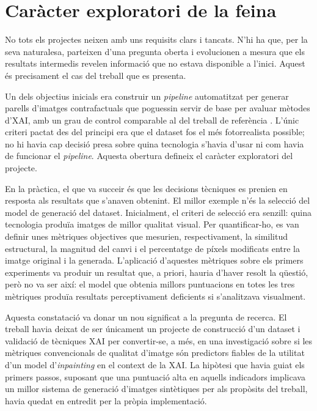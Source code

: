 \section{Caràcter exploratori de la feina}
No tots els projectes neixen amb uns requisits clars i tancats. N'hi ha que, per la seva naturalesa, parteixen d'una pregunta oberta i evolucionen a mesura que els resultats intermedis revelen informació que no estava disponible a l'inici. Aquest és precisament el cas del treball que es presenta.

Un dels objectius inicials era construir un \emph{pipeline} automatitzat per generar parells d'imatges contrafactuals que poguessin servir de base per avaluar mètodes d'XAI, amb un grau de control comparable al del treball de referència \cite{Hesse2023}. L'únic criteri pactat des del principi era que el dataset fos el més fotorrealista possible; no hi havia cap decisió presa sobre quina tecnologia s'havia d'usar ni com havia de funcionar el \emph{pipeline}. Aquesta obertura defineix el caràcter exploratori del projecte.

En la pràctica, el que va succeir és que les decisions tècniques es prenien en resposta als resultats que s'anaven obtenint. El millor exemple n'és la selecció del model de generació del dataset. Inicialment, el criteri de selecció era senzill: quina tecnologia produïa imatges de millor qualitat visual. Per quantificar-ho, es van definir unes mètriques objectives que mesurien, respectivament, la similitud estructural, la magnitud del canvi i el percentatge de píxels modificats entre la imatge original i la generada. L'aplicació d'aquestes mètriques sobre els primers experiments va produir un resultat que, a priori, hauria d'haver resolt la qüestió, però no va ser així: el model que obtenia millors puntuacions en totes les tres mètriques produïa resultats perceptivament deficients si s'analitzava visualment.

Aquesta constatació va donar un nou significat a la pregunta de recerca. El treball havia deixat de ser únicament un projecte de construcció d'un dataset i validació de tècniques \ac{XAI} per convertir-se, a més, en una investigació sobre si les mètriques convencionals de qualitat d'imatge són predictors fiables de la utilitat d'un model d'\emph{inpainting} en el context de la XAI. La hipòtesi que havia guiat els primers passos, suposant que una puntuació alta en aquells indicadors implicava un millor sistema de generació d'imatges sintètiques per als propòsits del treball, havia quedat en entredit per la pròpia implementació.

